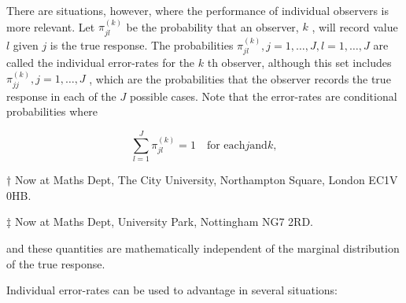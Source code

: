 \documentclass[
]{article}
\begin{document}
There are situations, however, where the performance of individual
observers is more relevant. Let \(\pi_{jl}^{(k)}\) be the probability
that an observer, \(k\) , will record value \(l\) given \(j\) is the
true response. The probabilities
\(\pi_{jl}^{(k)}, j = 1, \dots, J, l = 1, \dots, J\) are called the
individual error-rates for the \(k\) th observer, although this set
includes \(\pi_{jj}^{(k)}, j = 1, \dots, J\) , which are the
probabilities that the observer records the true response in each of the
\(J\) possible cases. Note that the error-rates are conditional
probabilities where

\[
\sum_ {l = 1} ^ {J} \pi_ {j l} ^ {(k)} = 1 \quad \text {for each} j \text {and} k,
\]

† Now at Maths Dept, The City University, Northampton Square, London
EC1V 0HB.

‡ Now at Maths Dept, University Park, Nottingham NG7 2RD.

and these quantities are mathematically independent of the marginal
distribution of the true response.

Individual error-rates can be used to advantage in several situations:
\end{document}
